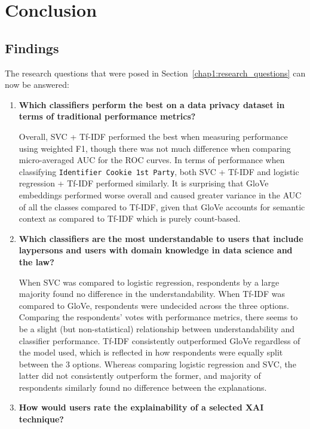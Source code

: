 \chapter{Conclusion} %
\label{chapter5} %

\section{Findings}
The research questions that were posed in Section~\ref{chap1:research_questions} can now be answered:
\begin{enumerate}
    \item \textbf{Which classifiers perform the best on a data privacy dataset in terms of traditional performance metrics?}
    
    Overall, SVC + Tf-IDF performed the best when measuring performance using weighted F1, though there was not much difference when comparing micro-averaged AUC for the ROC curves. In terms of performance when classifying \texttt{Identifier Cookie 1st Party}, both SVC + Tf-IDF and logistic regression + Tf-IDF performed similarly. It is surprising that GloVe embeddings performed worse overall and caused greater variance in the AUC of all the classes compared to Tf-IDF, given that GloVe accounts for semantic context as compared to Tf-IDF which is purely count-based.

    \item \textbf{Which classifiers are the most understandable to users that include laypersons and users with domain knowledge in data science and the law?}
    
    When SVC was compared to logistic regression, respondents by a large majority found no difference in the understandability. When Tf-IDF was compared to GloVe, respondents were undecided across the three options. Comparing the respondents' votes with performance metrics, there seems to be a slight (but non-statistical) relationship between understandability and classifier performance. Tf-IDF consistently outperformed GloVe regardless of the model used, which is reflected in how respondents were equally split between the 3 options. Whereas comparing logistic regression and SVC, the latter did not consistently outperform the former, and majority of respondents similarly found no difference between the explanations.

    \item \textbf{How would users rate the explainability of a selected XAI technique?}
    

\end{enumerate}
